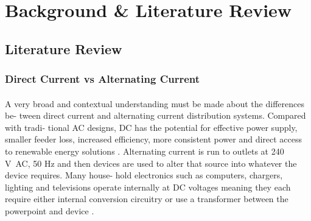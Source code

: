 
\section{Background \& Literature Review}



\subsection{Literature Review}

\subsubsection{Direct Current vs Alternating Current}

\paragraph{}
A very broad and contextual understanding must be made about the differences be-
tween direct current and alternating current distribution systems. Compared with tradi-
tional AC designs, DC has the potential for effective power supply, smaller feeder
loss, increased efficiency, more consistent power and direct access to renewable
energy solutions \cite{Liu2014}. Alternating current is run to outlets at 240 \si{V AC}, 50 \si{Hz} and then devices are used to alter that source into whatever the device requires. Many house-
hold electronics such as computers, chargers, lighting and televisions operate internally
at DC voltages meaning they each require either internal conversion circuitry or use a
transformer between the powerpoint and device \cite{Paajanen2009}.

